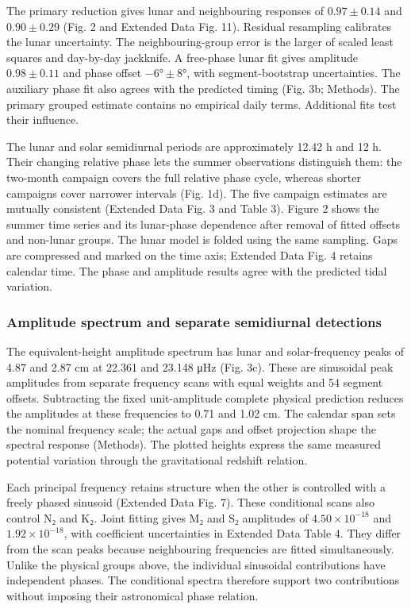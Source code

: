 \documentclass[
  11pt,
  a4paper,
]{article}
\begin{document}
The primary reduction gives lunar and neighbouring responses of
\(0.97\pm0.14\) and \(0.90\pm0.29\) (Fig. 2 and Extended Data Fig. 11).
Residual resampling calibrates the lunar uncertainty. The
neighbouring-group error is the larger of scaled least squares and
day-by-day jackknife. A free-phase lunar fit gives amplitude
\(0.98\pm0.11\) and phase offset \(-6°\pm8°\), with segment-bootstrap
uncertainties. The auxiliary phase fit also agrees with the predicted
timing (Fig. 3b; Methods). The primary grouped estimate contains no
empirical daily terms. Additional fits test their influence.

The lunar and solar semidiurnal periods are approximately 12.42 h and 12
h. Their changing relative phase lets the summer observations
distinguish them: the two-month campaign covers the full relative phase
cycle, whereas shorter campaigns cover narrower intervals (Fig. 1d). The
five campaign estimates are mutually consistent (Extended Data Fig. 3
and Table 3). Figure 2 shows the summer time series and its lunar-phase
dependence after removal of fitted offsets and non-lunar groups. The
lunar model is folded using the same sampling. Gaps are compressed and
marked on the time axis; Extended Data Fig. 4 retains calendar time. The
phase and amplitude results agree with the predicted tidal variation.

\hypertarget{amplitude-spectrum-and-separate-semidiurnal-detections}{%
\subsubsection{Amplitude spectrum and separate semidiurnal
detections}\label{amplitude-spectrum-and-separate-semidiurnal-detections}}

The equivalent-height amplitude spectrum has lunar and solar-frequency
peaks of 4.87 and 2.87 cm at 22.361 and 23.148 μHz (Fig. 3c). These are
sinusoidal peak amplitudes from separate frequency scans with equal
weights and 54 segment offsets. Subtracting the fixed unit-amplitude
complete physical prediction reduces the amplitudes at these frequencies
to 0.71 and 1.02 cm. The calendar span sets the nominal frequency scale;
the actual gaps and offset projection shape the spectral response
(Methods). The plotted heights express the same measured potential
variation through the gravitational redshift relation.

Each principal frequency retains structure when the other is controlled
with a freely phased sinusoid (Extended Data Fig. 7). These conditional
scans also control N₂ and K₂. Joint fitting gives M₂ and S₂ amplitudes
of \(4.50\times10^{-18}\) and \(1.92\times10^{-18}\), with coefficient
uncertainties in Extended Data Table 4. They differ from the scan peaks
because neighbouring frequencies are fitted simultaneously. Unlike the
physical groups above, the individual sinusoidal contributions have
independent phases. The conditional spectra therefore support two
contributions without imposing their astronomical phase relation.
\end{document}

